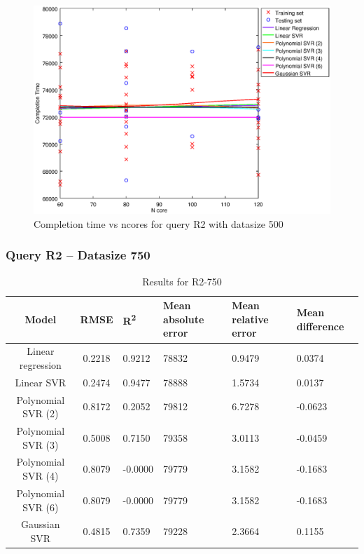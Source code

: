 \documentclass[a4paper,11pt]{article}
\begin{document}
\begin {figure}[hbtp]
\centering
\includegraphics[width=\textwidth]{output/R2_500_LINEAR_NCORE/plot_R2_500.eps}
\caption{Completion time vs ncores for query R2 with datasize 500}
\label{fig:all_linear_R2_500}
\end {figure}

\newpage
\subsubsection{Query R2 -- Datasize 750}
\begin{table}[H]
	\centering
	\begin{adjustbox}{center}
		\begin{tabular}{c | c M{1.2cm} M{2.5cm} M{2.5cm} M{1.8cm}}
			Model & RMSE & R\textsuperscript{2} & Mean absolute error & Mean relative error & Mean difference \tabularnewline
			\hline
			Linear regression & 0.2218 & 0.9212 &  78832 & 0.9479 & 0.0374 \\
			Linear SVR & 0.2474 & 0.9477 &  78888 & 1.5734 & 0.0137 \\
			Polynomial SVR (2) & 0.8172 & 0.2052 &  79812 & 6.7278 & -0.0623 \\
			Polynomial SVR (3) & 0.5008 & 0.7150 &  79358 & 3.0113 & -0.0459 \\
			Polynomial SVR (4) & 0.8079 & -0.0000 &  79779 & 3.1582 & -0.1683 \\
			Polynomial SVR (6) & 0.8079 & -0.0000 &  79779 & 3.1582 & -0.1683 \\
			Gaussian SVR & 0.4815 & 0.7359 &  79228 & 2.3664 & 0.1155 \\
		\end{tabular}
	\end{adjustbox}
	\\
	\caption{Results for R2-750}
	\label{fig:all_linear_R2_750}
\end{table}
\end{document}

